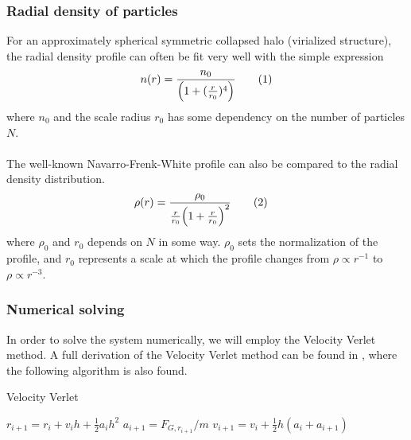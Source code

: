 \documentclass{article}
\newcommand\numberthis{\addtocounter{equation}{1}\tag{\theequation}}
\begin{document}
\subsubsection{Radial density of particles}
For an approximately spherical symmetric collapsed halo (virialized structure), the radial density profile can often be fit very well with the simple expression
\begin{align*}
  n(r) = \frac{n_0}{\Big(1+(\frac{r}{r_0})^4\Big)} \numberthis\label{eq:radial_dist}
\end{align*}
where $n_0$ and the scale radius $r_0$ has some dependency on the number of particles $N$.\\\\
The well-known Navarro-Frenk-White profile can also be compared to the radial density distribution.
\begin{align*}
  \rho(r) &= \frac{\rho_0}{\frac{r}{r_0}\Big(1+\frac{r}{r_0}\Big)^2}\numberthis\label{eq:NFW}
\end{align*}
where $\rho_0$ and $r_0$ depends on $N$ in some way. $\rho_0$ sets the normalization of the profile, and $r_0$ represents a scale at which the profile changes from $\rho \propto r^{-1}$ to $\rho \propto r^{-3}$.
\subsubsection{Numerical solving}
In order to solve the system numerically, we will employ the Velocity Verlet method. A full derivation of the Velocity Verlet method can be found in \cite{Github3}, where the following algorithm is also found.
\begin{algorithm}[H]
\small
\caption{Velocity Verlet}\label{alg:VelVerlet}
\begin{algorithmic}[1]
\State $r_{i+1} = r_i + v_i h + \frac{1}{2} a_i h^2$
\State $a_{i+1} = F_{G, r_{i+1}}/m$
\State $v_{i+1} = v_i + \frac{1}{2} h (a_i + a_{i+1})$
\EndFor
\end{algorithmic}
\end{algorithm}
\end{document}

